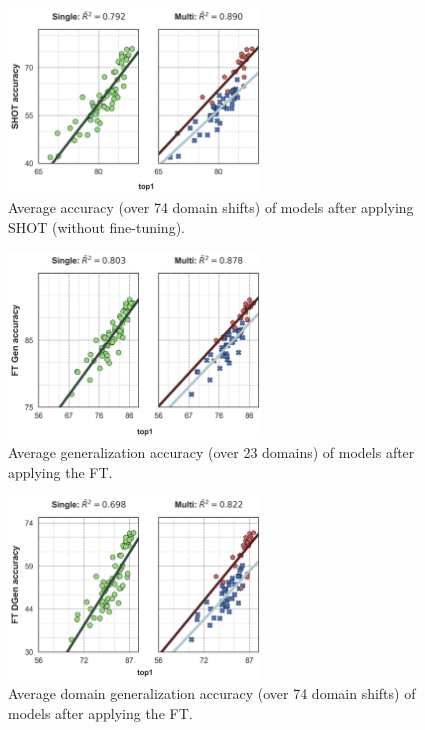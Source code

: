 \documentclass{article}
\begin{document}
\begin{figure}[h!]

\begin{center}
\includegraphics[width=0.6\textwidth]{images_lines/multilinear_shot.png}
\end{center}
\caption{Average accuracy (over 74 domain shifts) of models after applying SHOT (without fine-tuning).}
\label{shotlines}
\end{figure}


\begin{figure}[h!]
\begin{center}
\includegraphics[width=0.6\textwidth]{images_lines/multilinear_FT_Gen.png}
\end{center}
\caption{Average generalization accuracy (over 23 domains) of models after applying the FT.}
\end{figure}


\begin{figure}[h!]
\begin{center}
\includegraphics[width=0.6\textwidth]{images_lines/multilinear_FT_DGen.png}
\end{center}
\caption{Average domain generalization accuracy (over 74 domain shifts) of models after applying the FT.}
\end{figure}
\end{document}
